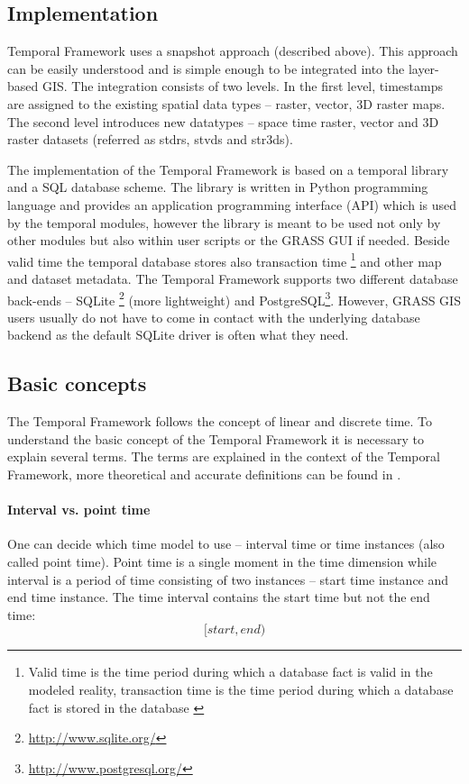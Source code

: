 \documentclass[a4paper,12pt]{book}
\newcommand{\tf}{Temporal Framework\xspace}
\begin{document}
\subsection{Implementation}
\tf uses a snapshot approach (described above).
This approach can be easily understood and is simple enough to be integrated into the layer-based GIS.
The integration consists of two levels.
In the first level, timestamps are assigned to the existing spatial data types -- raster, vector, 3D raster maps.
The second level introduces new datatypes -- space time raster,
vector and 3D raster datasets (referred as stdrs, stvds and str3ds).

The implementation of the \tf is based on a temporal library and a SQL database scheme.
The library is written in Python programming language and provides an application programming interface (API) which is used by the temporal modules,
however the library is meant to be used not only by other modules but also within user scripts or the GRASS GUI if needed.
Beside valid time the temporal database stores also transaction time%
\footnote{Valid time is the time period during which a database fact is valid in the modeled reality,
transaction time  is the time period during which a database fact is stored in the database \cite{temporalGlossary}}
and other map and dataset metadata.
The \tf supports two different database back-ends -- SQLite%
\footnote{\url{http://www.sqlite.org/}} (more lightweight) and
PostgreSQL\footnote{\url{http://www.postgresql.org/}}.
However, GRASS GIS users usually do not have to come in contact with the underlying database backend
as the default SQLite driver is often what they need.

\subsection{Basic concepts}
The \tf follows the concept of linear and discrete time.
To understand the basic concept of the \tf it is necessary to explain several terms.
The terms are explained in the context of the \tf , more theoretical and accurate definitions can be found in \cite{temporalGlossary}.

\paragraph{Interval vs. point time}
\label{sec:intervalVsPoint}
One can decide which time model to use -- interval time or time instances (also called point time).
Point time is a single moment in the time dimension
while interval is a period of time consisting of two instances -- start time instance and end time instance.
The time interval contains the start time but not the end time:
$$[start, end)$$
\end{document}
